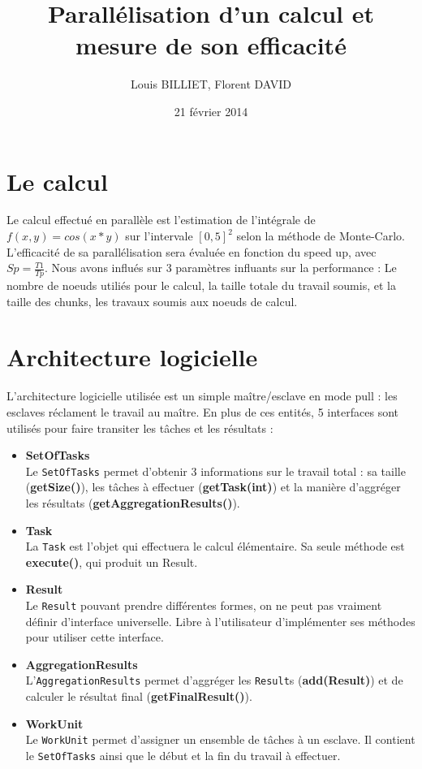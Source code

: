 \documentclass[oneside,10pt]{article}
\begin{document}
\title{Parall\'elisation d'un calcul et mesure de son efficacit\'e}
\author{Louis BILLIET, Florent DAVID}
\date{21 f\'evrier 2014}
\maketitle

\section{Le calcul}
Le calcul effectu\'e en parall\`ele est l'estimation de l'int\'egrale de $f(x,y)=cos(x*y)$ sur l'intervale $[0,5]^2$ selon la m\'ethode de Monte-Carlo.
L'efficacit\'e de sa parall\'elisation sera \'evalu\'ee en fonction du speed up, avec $Sp = \frac{T1}{Tp}$.
Nous avons influ\'es sur 3 param\`etres influants sur la performance : Le nombre de noeuds utili\'es pour le calcul, la taille totale du travail soumis, et la taille des chunks, les travaux soumis aux noeuds de calcul.

\section{Architecture logicielle}
L'architecture logicielle utilis\'ee est un simple ma\^itre/esclave en mode pull : les esclaves r\'eclament le travail au ma\^itre.
En plus de ces entit\'es, 5 interfaces sont utilis\'es pour faire transiter les t\^aches et les r\'esultats :

\begin{itemize}

\item \textbf{SetOfTasks}\\
Le \verb+SetOfTasks+ permet d'obtenir 3 informations sur le travail total :
sa taille (\textbf{getSize()}),
les t\^aches \`a effectuer (\textbf{getTask(int)}) et
la mani\`ere d'aggr\'eger les r\'esultats (\textbf{getAggregationResults()}).

\item \textbf{Task}\\
La \verb+Task+ est l'objet qui effectuera le calcul \'el\'ementaire.
Sa seule m\'ethode est \textbf{execute()}, qui produit un Result. 

\item \textbf{Result}\\
Le \verb+Result+ pouvant prendre diff\'erentes formes, on ne peut pas vraiment d\'efinir d'interface universelle.
Libre \`a l'utilisateur d'impl\'ementer ses m\'ethodes pour utiliser cette interface.

\item \textbf{AggregationResults}\\
L'\verb+AggregationResults+ permet d'aggr\'eger les \verb+Result+s (\textbf{add(Result)}) et de calculer le r\'esultat final (\textbf{getFinalResult()}).

\item \textbf{WorkUnit}\\
Le \verb+WorkUnit+ permet d'assigner un ensemble de t\^aches \`a un esclave.
Il contient le \verb+SetOfTasks+ ainsi que le d\'ebut et la fin du travail \`a effectuer.

\end{itemize}
\end{document}
